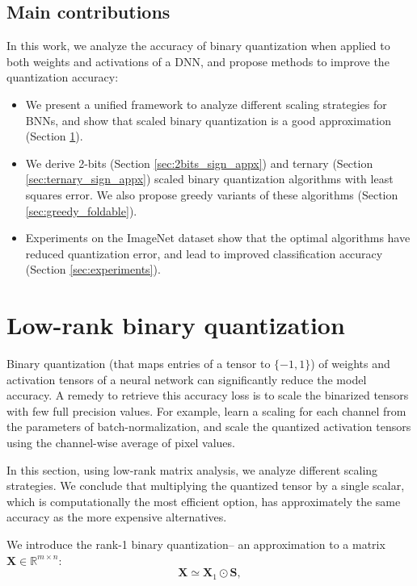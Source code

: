\documentclass[10pt,twocolumn,letterpaper]{article}
\def\mX{{\bm{X}}}
\def\mS{{\bm{S}}}
\newcommand{\R}{\mathbb{R}}
\begin{document}
\subsection{Main contributions}
In this work, we analyze the accuracy of binary quantization when applied to both weights and activations of a DNN, and propose methods to improve the quantization accuracy:
\begin{itemize}
\itemsep0em
\item We present a unified framework to analyze different scaling strategies for BNNs, and show that scaled binary quantization is a good approximation (Section \ref{sec:lr_sign_appx}).
\item We derive 2-bits (Section \ref{sec:2bits_sign_appx}) and ternary (Section \ref{sec:ternary_sign_appx}) scaled binary quantization algorithms with least squares error. We also propose greedy variants of these algorithms (Section \ref{sec:greedy_foldable}).
\item Experiments on the ImageNet dataset show that the optimal algorithms have reduced quantization error, and lead to improved classification accuracy (Section \ref{sec:experiments}).
\end{itemize}

\section{Low-rank binary quantization}\label{sec:lr_sign_appx}
Binary quantization (that maps entries of a tensor to $\{-1,1\}$) of weights and activation tensors of a neural network can significantly reduce the model accuracy. A remedy to retrieve this accuracy loss is to scale the binarized tensors with few full precision values. For example, \cite{hubara2017quantized} learn a scaling for each channel from the parameters of batch-normalization, and \cite{rastegari2016xnor} scale the quantized activation tensors using the channel-wise average of pixel values.

In this section, using low-rank matrix analysis, we analyze  different scaling strategies. We conclude that multiplying the quantized tensor by a single scalar, which is computationally the most efficient option, has approximately the same accuracy as the more expensive alternatives.

We introduce the rank-1 binary quantization-- an approximation to a matrix $\mX\in \R^{m\times n}$:
\begin{equation}
	\mX \simeq \mX_1 \odot \mS,
\end{equation}
\end{document}

